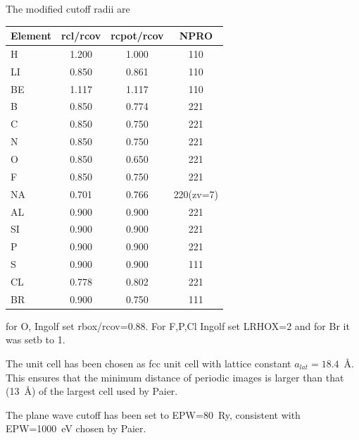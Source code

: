 \documentclass[11pt,a4paper]{report}
\begin{document}
The modified cutoff radii are
\begin{center}
\begin{tabular}{|l|c|c|c|}
\hline
Element  & rcl/rcov & rcpot/rcov & NPRO\\
\hline                            
H        &  1.200  &   1.000  &  110\\
LI       &  0.850  &   0.861  &  110\\
BE       &  1.117  &   1.117  &  110\\
B        &  0.850  &   0.774  &  221\\
C        &  0.850  &   0.750  &  221\\
N        &  0.850  &   0.750  &  221\\
O        &  0.850  &   0.650  &  221\\
F        &  0.850  &   0.750  &  221\\
NA       &  0.701  &   0.766  &  220(zv=7)\\
AL       &  0.900  &   0.900  &  221\\
SI       &  0.900  &   0.900  &  221\\
P        &  0.900  &   0.900  &  221\\
S        &  0.900  &   0.900  &  111\\
CL       &  0.778  &   0.802  &  221\\
BR       &  0.900  &   0.750  &  111\\
\hline
\end{tabular}
\end{center}
for O, Ingolf set rbox/rcov=0.88. For F,P,Cl Ingolf set LRHOX=2 and
for Br it was setb to 1.





 
The unit cell has been chosen as fcc unit cell with lattice constant
$a_{lat}=18.4$~\AA. This ensures that the minimum distance of periodic
images is larger than that (13~\AA) of the largest cell used by
Paier\cite{paier05_jcp122_23410}.

The plane wave cutoff has been set to EPW=80~Ry, consistent with
EPW=1000~eV chosen by Paier.
\end{document}

